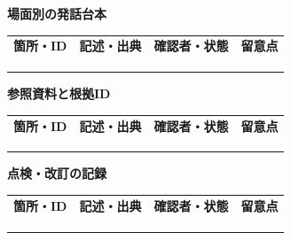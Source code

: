 \documentclass[11pt,a4paper]{article}
\begin{document}
\par{}\noindent\textbf{場面別の発話台本}\par\vspace{1mm}
{\fontsize{8.5}{13}\selectfont
\begin{tabularx}{\linewidth}{@{}XXXX@{}}
\textbf{箇所・ID} & \textbf{記述・出典} & \textbf{確認者・状態} & \textbf{留意点}\\[2mm]
\strut & \strut & \strut & \strut\\[5mm]
\strut & \strut & \strut & \strut\\[5mm]
\strut & \strut & \strut & \strut\\[5mm]
\end{tabularx}
}\vspace{2mm}\par
{}
\par{}\noindent\textbf{参照資料と根拠ID}\par\vspace{1mm}
{\fontsize{8.5}{13}\selectfont
\begin{tabularx}{\linewidth}{@{}XXXX@{}}
\textbf{箇所・ID} & \textbf{記述・出典} & \textbf{確認者・状態} & \textbf{留意点}\\[2mm]
\strut & \strut & \strut & \strut\\[5mm]
\strut & \strut & \strut & \strut\\[5mm]
\strut & \strut & \strut & \strut\\[5mm]
\end{tabularx}
}\vspace{2mm}\par
{}
\par{}\noindent\textbf{点検・改訂の記録}\par\vspace{1mm}
{\fontsize{8.5}{13}\selectfont
\begin{tabularx}{\linewidth}{@{}XXXX@{}}
\textbf{箇所・ID} & \textbf{記述・出典} & \textbf{確認者・状態} & \textbf{留意点}\\[2mm]
\strut & \strut & \strut & \strut\\[5mm]
\strut & \strut & \strut & \strut\\[5mm]
\strut & \strut & \strut & \strut\\[5mm]
\end{tabularx}
}\vspace{2mm}\par
\end{document}
